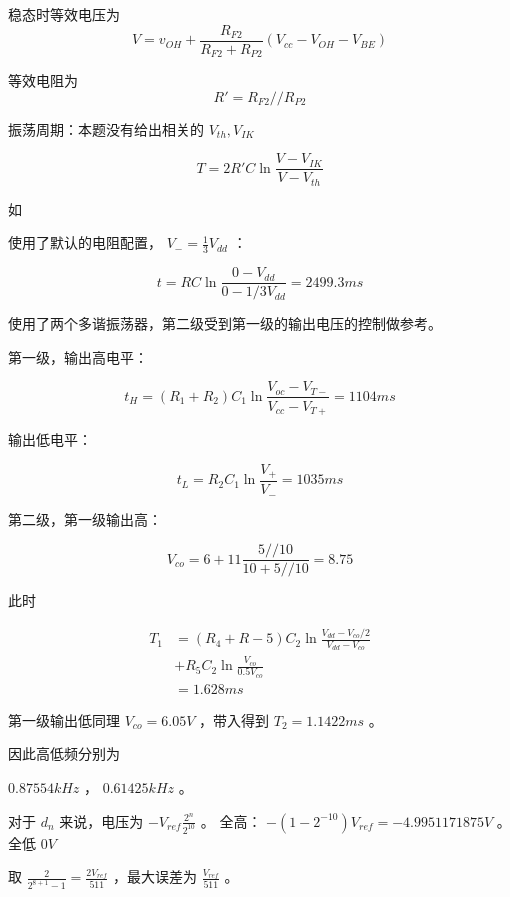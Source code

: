 \documentclass[lang=cn,11pt,a4paper,cite=authoryear,twocolumn]{elegantpaper}
\begin{document}

稳态时等效电压为 \[V = v_{OH} + \frac{R_{F2}}{R_{F2} + R_{P2}}(V_{cc} - V_{OH} - V_{BE})\] 

等效电阻为 \[R' = R_{F2} // R_{P2}\]

振荡周期：本题没有给出相关的 \(V_{th}, V_{IK}\)

\[T = 2 R' C \ln \frac{V - V_{IK}}{V - V_{th}}\] 


如 



使用了默认的电阻配置， \(V_- = \frac{1}{3}V_{dd}\) ：

\[t = RC \ln \frac{0-V_{dd}}{0-1/3 V_{dd}} = 2499.3 ms\]


使用了两个多谐振荡器，第二级受到第一级的输出电压的控制做参考。

第一级，输出高电平：

\[t_H = (R_1 + R_2) C_1 \ln \frac{V_{oc} - V_{T-}}{V_{cc} - V_{T+}} = 1104 ms\]

输出低电平：

\[t_L = R_2 C_1 \ln \frac{V_+}{V_-} = 1035 ms\]

第二级，第一级输出高： 

\[V_{co} = 6 + 11 \frac{5 // 10}{10 + 5 // 10} = 8.75\]

此时 

\[\begin{aligned}
    T_1 &= (R_4 + R-5) C_2 \ln \frac{V_{dd} - V_{co} / 2}{V_{dd} - V_{co}} \\ 
    & + R_5 C_2 \ln \frac{V_{co}}{0.5 V_{co}}\\ 
    &= 1.628 ms 
\end{aligned}\]

第一级输出低同理 \(V_{co} = 6.05 V\) ，带入得到 \(T_2 = 1.1422 ms\) 。

因此高低频分别为

\(0.87554 kHz \text{ ， }0.61425 kHz\) 。


对于 \(d_n\) 来说，电压为 \(-V_{ref} \frac{2^n}{2^10}\) 。 全高： \(-(1 - 2^{-10})V_{ref} = - 4.9951171875 V \) 。全低 \(0 V\)


取 \(\frac{2 }{2^{8 + 1} - 1} = \frac{2 V_{ref}}{511}\) ，最大误差为 \(\frac{V_{ref}}{511}\) 。

\end{document}
